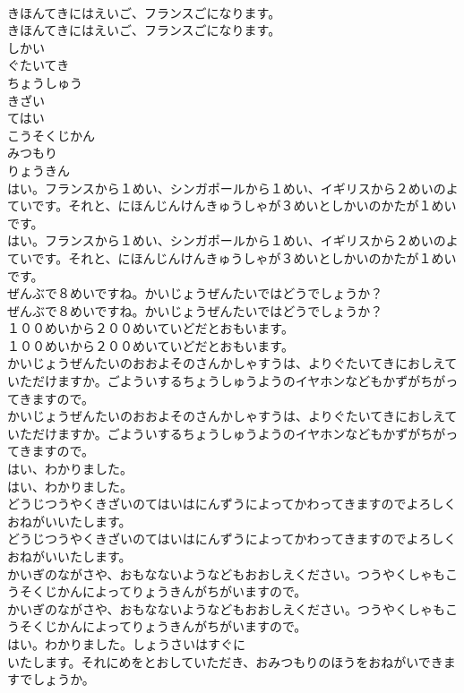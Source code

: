 \documentclass[8pt]{extreport}
\begin{document}
\begin{CJK}{UTF8}{min}
\\	きほんてきにはえいご、フランスごになります。
\\	きほんてきにはえいご、フランスごになります。
\\	しかい
\\	ぐたいてき
\\	ちょうしゅう
\\	きざい
\\	てはい
\\	こうそくじかん
\\	みつもり
\\	りょうきん
\\	はい。フランスから１めい、シンガポールから１めい、イギリスから２めいのよていです。それと、にほんじんけんきゅうしゃが３めいとしかいのかたが１めいです。
\\	はい。フランスから１めい、シンガポールから１めい、イギリスから２めいのよていです。それと、にほんじんけんきゅうしゃが３めいとしかいのかたが１めいです。
\\	ぜんぶで８めいですね。かいじょうぜんたいではどうでしょうか？
\\	ぜんぶで８めいですね。かいじょうぜんたいではどうでしょうか？
\\	１００めいから２００めいていどだとおもいます。
\\	１００めいから２００めいていどだとおもいます。
\\	かいじょうぜんたいのおおよそのさんかしゃすうは、よりぐたいてきにおしえていただけますか。ごよういするちょうしゅうようのイヤホンなどもかずがちがってきますので。
\\	かいじょうぜんたいのおおよそのさんかしゃすうは、よりぐたいてきにおしえていただけますか。ごよういするちょうしゅうようのイヤホンなどもかずがちがってきますので。
\\	はい、わかりました。
\\	はい、わかりました。
\\	どうじつうやくきざいのてはいはにんずうによってかわってきますのでよろしくおねがいいたします。
\\	どうじつうやくきざいのてはいはにんずうによってかわってきますのでよろしくおねがいいたします。
\\	かいぎのながさや、おもなないようなどもおおしえください。つうやくしゃもこうそくじかんによってりょうきんがちがいますので。
\\	かいぎのながさや、おもなないようなどもおおしえください。つうやくしゃもこうそくじかんによってりょうきんがちがいますので。
\\	はい。わかりました。しょうさいはすぐに
\\	いたします。それにめをとおしていただき、おみつもりのほうをおねがいできますでしょうか。

\end{CJK}
\end{document}
